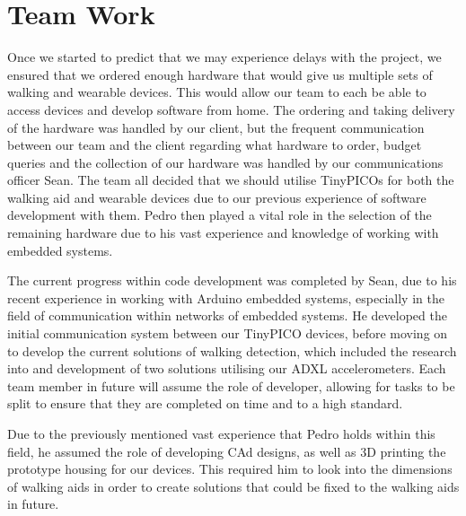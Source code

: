 \chapter{Team Work}

Once we started to predict that we may experience delays with the project, we ensured that we ordered enough hardware that would give us multiple sets of walking and wearable devices. This would allow our team to each be able to access devices and develop software from home. The ordering and taking delivery of the hardware was handled by our client, but the frequent communication between our team and the client regarding what hardware to order, budget queries and the collection of our hardware was handled by our communications officer Sean. The team all decided that we should utilise TinyPICOs for both the walking aid and wearable devices due to our previous experience of software development with them. Pedro then played a vital role in the selection of the remaining hardware due to his vast experience and knowledge of working with embedded systems.

The current progress within code development was completed by Sean, due to his recent experience in working with Arduino embedded systems, especially in the field of communication within networks of embedded systems. He developed the initial communication system between our TinyPICO devices, before moving on to develop the current solutions of walking detection, which included the research into and development of two solutions utilising our ADXL accelerometers. Each team member in future will assume the role of developer, allowing for tasks to be split to ensure that they are completed on time and to a high standard. 

Due to the previously mentioned vast experience that Pedro holds within this field, he assumed the role of developing CAd designs, as well as 3D printing the prototype housing for our devices. This required him to look into the dimensions of walking aids in order to create solutions that could be fixed to the walking aids in future.

